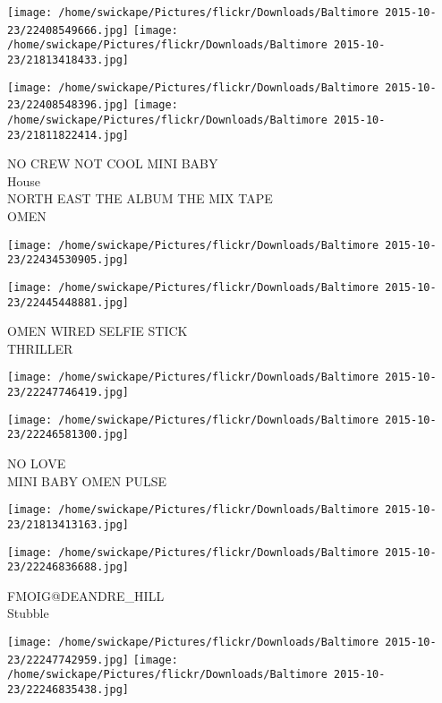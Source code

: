 \documentclass[10pt,letterpaper]{article}
\begin{document}
\texttt{[image: /home/swickape/Pictures/flickr/Downloads/Baltimore 2015-10-23/22408549666.jpg]}
\texttt{[image: /home/swickape/Pictures/flickr/Downloads/Baltimore 2015-10-23/21813418433.jpg]}

\texttt{[image: /home/swickape/Pictures/flickr/Downloads/Baltimore 2015-10-23/22408548396.jpg]}
\texttt{[image: /home/swickape/Pictures/flickr/Downloads/Baltimore 2015-10-23/21811822414.jpg]}

NO CREW NOT COOL MINI BABY\\
House\\
NORTH EAST THE ALBUM THE MIX TAPE\\
OMEN\\
\pagebreak

\texttt{[image: /home/swickape/Pictures/flickr/Downloads/Baltimore 2015-10-23/22434530905.jpg]}

\vspace{0.25in}
\texttt{[image: /home/swickape/Pictures/flickr/Downloads/Baltimore 2015-10-23/22445448881.jpg]}

OMEN WIRED SELFIE STICK\\
THRILLER\\
\pagebreak

\texttt{[image: /home/swickape/Pictures/flickr/Downloads/Baltimore 2015-10-23/22247746419.jpg]}

\vspace{0.25in}
\texttt{[image: /home/swickape/Pictures/flickr/Downloads/Baltimore 2015-10-23/22246581300.jpg]}

NO LOVE\\
MINI BABY OMEN PULSE\\
\pagebreak

\texttt{[image: /home/swickape/Pictures/flickr/Downloads/Baltimore 2015-10-23/21813413163.jpg]}

\vspace{0.25in}
\texttt{[image: /home/swickape/Pictures/flickr/Downloads/Baltimore 2015-10-23/22246836688.jpg]}

FMOIG@DEANDRE\_HILL\\
Stubble\\
\pagebreak

\texttt{[image: /home/swickape/Pictures/flickr/Downloads/Baltimore 2015-10-23/22247742959.jpg]}
\texttt{[image: /home/swickape/Pictures/flickr/Downloads/Baltimore 2015-10-23/22246835438.jpg]}
\end{document}
